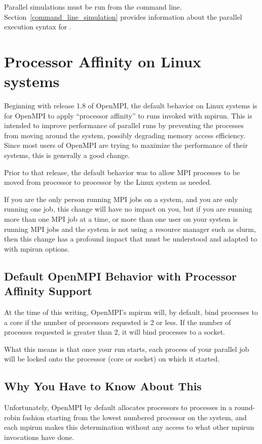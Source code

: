 Parallel simulations must be run from the command line.  Section~\ref{command_line_simulation} provides 
information about the parallel execution syntax for \Xyce{}.

\section{Processor Affinity on Linux systems}
\label{paffinity}

Beginning with release 1.8 of OpenMPI, the default behavior on Linux
systems is for OpenMPI to apply ``processor affinity'' to runs invoked
with mpirun.  This is intended to improve performance of parallel runs
by preventing the processes from moving around the system, possibly
degrading memory access efficiency.  Since most users of OpenMPI are
trying to maximize the performance of their systems, this is generally
a good change.

Prior to that release, the default behavior was to allow
MPI processes to be moved from processor to processor by the Linux
system as needed.

If you are the only person running MPI jobs on a system, and you are
only running one job, this change will have no impact on you, but if
you are running more than one MPI job at a time, or more than one user
on your system is running MPI jobs and the system is not using a
resource manager such as slurm, then this change has a profound impact
that must be understood and adapted to with mpirun options.

\subsection{Default OpenMPI Behavior with Processor Affinity Support}

At the time of this writing, OpenMPI's mpirun will, by default, bind
processes to a core if the number of processors requested is 2 or
less.  If the number of processes requested is greater than 2, it
will bind processes to a socket.

What this means is that once your run starts, each process of your
parallel job will be locked onto the processor (core or socket) on
which it started.

\subsection{Why You Have to Know About This}
Unfortunately, OpenMPI by default allocates processors to processes in
a round-robin fashion starting from the lowest numbered processor on
the system, and each mpirun makes this determination without any
access to what other mpirun invocations have done.

